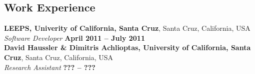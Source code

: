 \documentclass[margin,line]{resume}
\begin{document}
\begin{resume}
%
%
%
%
%

    \section{\mysidestyle Work Experience}

    \textbf{LEEPS, Univerity of California, Santa Cruz}, Santa Cruz, California, USA \vspace{2mm}\\\vspace{1mm}%
    \textsl{Software Developer} \hfill \textbf{April 2011 -- July 2011}\\

    \textbf{David Haussler \& Dimitris Achlioptas, University of California, Santa Cruz}, Santa Cruz, California, USA \vspace{2mm}\\\vspace{1mm}%
    \textsl{Research Assistant} \hfill \textbf{??? -- ???}\\


\end{resume}
\end{document}
